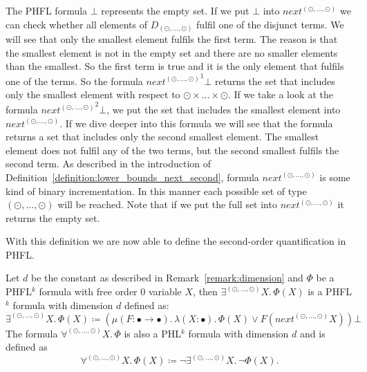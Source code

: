 \begin{remark}
\label{remark:lower_bounds_next_second}
	The PHFL formula $\bot$ represents the empty set. If we put $\bot$ into $next^{(\odot, \dots, \odot)}$ we can check whether all elements of $D_{(\odot, \dots, \odot)}$ fulfil one 
	of the disjunct terms. We will see that only the smallest element fulfils the first term. The reason is that the smallest element is not in the empty set and there are no smaller elements than the smallest.
	So the first term is true and it is the only element that fulfils one of the terms. So the formula ${next^{(\odot, \dots, \odot)}}^1 \bot$ returns the set that includes only the smallest 
	element with respect to $\odot \times \dots \times \odot$. If we take a look at the formula ${next^{(\odot, \dots, \odot)}}^2 \bot$, we put the set that includes the smallest element into 
	$next^{(\odot, \dots, \odot)}$. If we dive deeper into this formula we will see that the formula returns a set that includes only the second smallest element. The smallest element does not 
	fulfil any of the two terms, but the second smallest fulfils the second term. As described in the introduction of Definition~\ref{definition:lower_bounds_next_second}, formula $next^{(\odot, 
	\dots, \odot)}$ is some kind of binary incrementation. In this manner each possible set of type $(\odot, \dots, \odot)$ will be reached. Note that if we put the full set into $next^{(\odot, 
	\dots, \odot)}$ it returns the empty set.
\end{remark}

With this definition we are now able to define the second-order quantification in PHFL.

\begin{definition}
    \label{definition:existential_quantification_second}
    Let $d$ be the constant as described in Remark~\ref{remark:dimension} and $\Phi$ be a PHFL$^k$ formula with free order $0$ variable $X$, then $\exists^{(\odot, \dots, \odot)}X .\,\Phi(X)$
    is a PHFL$^k$ formula with dimension $d$ defined as:
    \[\exists^{(\odot, \dots, \odot)}X.\, \Phi(X) \coloneqq (\mu (F \colon \bullet \rightarrow \bullet).\, \lambda (X
    \colon \bullet).\, \Phi(X) \vee F(next^{(\odot, \dots, \odot)} X)) \bot
    \]
    The formula $\forall^{(\odot, \dots, \odot)}X.\,\Phi$ is also a PHL$^k$ formula with dimension $d$ and is defined as
    \[\forall^{(\odot, \dots, \odot)}X.\,\Phi(X) \coloneqq \neg \exists^{(\odot, \dots, \odot)}X .\,\neg\Phi(X).\]
\end{definition}

